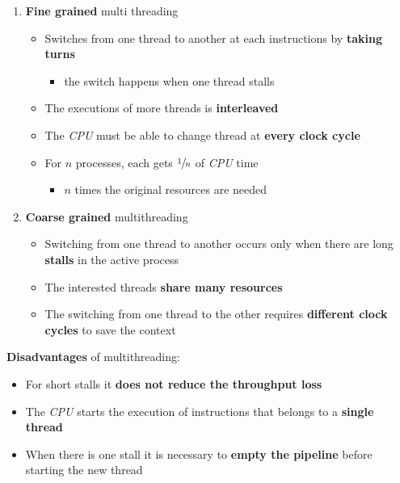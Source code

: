 \documentclass[english]{article}
\begin{document}
\begin{enumerate}
  \item \textbf{Fine grained} multi threading
        \begin{itemize}
          \item Switches from one thread to another at each instructions by \textbf{taking turns}
                \begin{itemize}
                  \item the switch happens when one thread stalls
                \end{itemize}
          \item The executions of more threads is \textbf{interleaved}
          \item The \textit{CPU} must be able to change thread at \textbf{every clock cycle}
          \item For \(n\) processes, each gets \(\sfrac{1}{n}\) of \textit{CPU} time
                \begin{itemize}
                  \item \(n\) times the original resources are needed
                \end{itemize}
        \end{itemize}
  \item \textbf{Coarse grained} multithreading
        \begin{itemize}
          \item Switching from one thread to another occurs only when there are long \textbf{stalls} in the active process
          \item The interested threads \textbf{share many resources}
          \item The switching from one thread to the other requires \textbf{different clock cycles} to save the context
        \end{itemize}
\end{enumerate}

\bigskip

\textbf{Disadvantages} of multithreading:
\begin{itemize}[label=\xmark]
  \item For short stalls it \textbf{does not reduce the throughput loss}
  \item The \textit{CPU} starts the execution of instructions that belongs to a \textbf{single thread}
  \item When there is one stall it is necessary to \textbf{empty the pipeline} before starting the new thread
\end{itemize}
\end{document}
